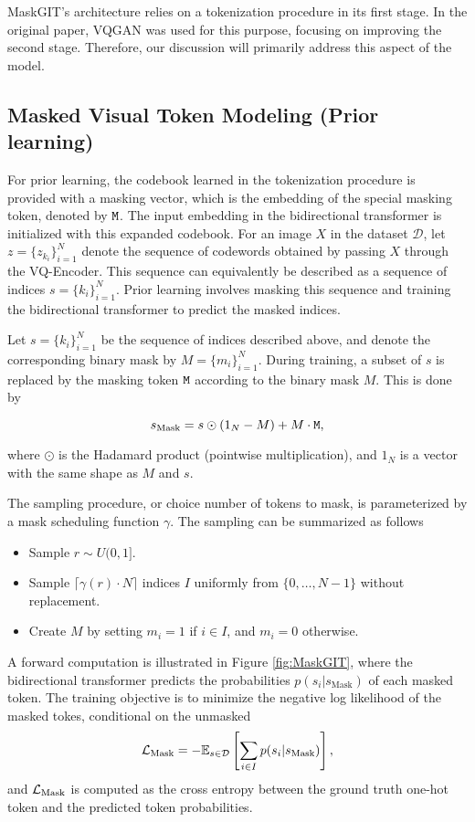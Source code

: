 \documentclass[../../thesis.tex]{subfiles}
\begin{document}
MaskGIT's architecture relies on a tokenization procedure in its first stage. In the original paper, VQGAN \cite{VQGAN} was used for this purpose, focusing on improving the second stage. Therefore, our discussion will primarily address this aspect of the model.

\subsection{Masked Visual Token Modeling (Prior learning)}

For prior learning, the codebook learned in the tokenization procedure is provided with a masking vector, which is the embedding of the special masking token, denoted by $\texttt{M}$. The input embedding in the bidirectional transformer is initialized with this expanded codebook. For an image $X$ in the dataset $\mathcal{D}$, let $z = \{z_{k_i}\}_{i=1}^N$ denote the sequence of codewords obtained by passing $X$ through the VQ-Encoder. This sequence can equivalently be described as a sequence of indices $s = \{k_i\}_{i=1}^N$. Prior learning involves masking this sequence and training the bidirectional transformer to predict the masked indices.
\newline

Let $s = \{k_i\}_{i=1}^N$ be the sequence of indices described above, and denote the corresponding binary mask by $M = \{m_i\}_{i=1}^N$. During training, a subset of $s$ is replaced by the masking token $\texttt{M}$ according to the binary mask $M$. This is done by 

\begin{equation}
    s_\text{Mask} = s\odot (1_N-M) +  M\cdot\texttt{M},
\end{equation}

where $\odot$ is the Hadamard product (pointwise multiplication), and $1_N$ is a vector with the same shape as $M$ and $s$.\newline

The sampling procedure, or choice number of tokens to mask, is parameterized by a mask scheduling function $\gamma$. The sampling can be summarized as follows

\begin{itemize}
    \item Sample $r \sim U(0,1]$.
    \item Sample $\lceil \gamma(r)\cdot N \rceil$ indices $I$ uniformly from $\{0,\dots,N-1\}$ without replacement. 
    \item Create $M$ by setting $m_i = 1$ if $i\in I$, and $m_i = 0$ otherwise.
\end{itemize}
A forward computation is illustrated in Figure \ref{fig:MaskGIT}, where the bidirectional transformer predicts the probabilities $p(s_i|s_\text{Mask})$ of each masked token. The training objective is to minimize the negative log likelihood of the masked tokes, conditional on the unmasked
\begin{equation}
    \mathcal{L}_\text{Mask} = -\mathbb{E}_{s\in \mathcal{D}}\left[\sum_{i \in I} p(s_i|s_\text{Mask} ) \right],
\end{equation}
and $\mathcal{L}_\text{Mask}$ is computed as the cross entropy between the ground truth one-hot token and the predicted token probabilities. 
\end{document}
